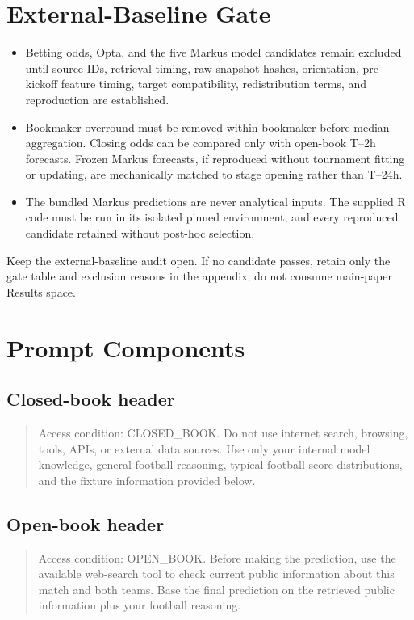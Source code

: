 \documentclass[sigconf,review]{acmart}
\newenvironment{draftbullets}
  {\begin{itemize}[leftmargin=1.25em,itemsep=1.5pt,topsep=2pt,parsep=0pt,partopsep=0pt]}
  {\end{itemize}}
\newcommand{\TODO}[1]{{\color{red}#1}}
\begin{document}
\section{External-Baseline Gate}
\begin{draftbullets}
  \item Betting odds, Opta, and the five Markus model candidates remain excluded until source IDs,
  retrieval timing, raw snapshot hashes, orientation, pre-kickoff feature timing, target compatibility,
  redistribution terms, and reproduction are established.
  \item Bookmaker overround must be removed within bookmaker before median aggregation. Closing odds
  can be compared only with open-book T--2h forecasts. Frozen Markus forecasts, if reproduced without
  tournament fitting or updating, are mechanically matched to stage opening rather than T--24h.
  \item The bundled Markus predictions are never analytical inputs. The supplied R code must be run in
  its isolated pinned environment, and every reproduced candidate retained without post-hoc selection.
\end{draftbullets}

\TODO{Keep the external-baseline audit open. If no candidate passes, retain only the gate table and exclusion reasons in the appendix; do not consume main-paper Results space.}

\section{Prompt Components}

\subsection*{Closed-book header}
\begin{quote}\small
Access condition: CLOSED\_BOOK. Do not use internet search, browsing, tools, APIs, or external data
sources. Use only your internal model knowledge, general football reasoning, typical football score
distributions, and the fixture information provided below.
\end{quote}

\subsection*{Open-book header}
\begin{quote}\small
Access condition: OPEN\_BOOK. Before making the prediction, use the available web-search tool to
check current public information about this match and both teams. Base the final prediction on the
retrieved public information plus your football reasoning.
\end{quote}
\end{document}
